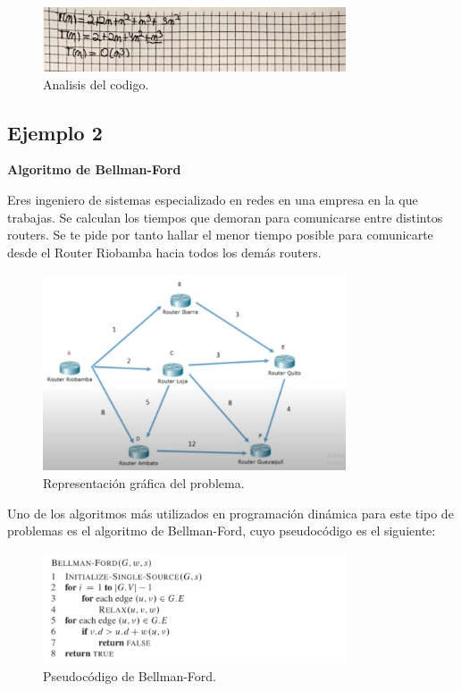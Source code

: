 \begin{figure}[H]
	\centering
	\includegraphics[width=0.8\textwidth]{complejidad_distancia_ejem1_3.png}
	\caption{Analisis del codigo.}
	\label{fig:complejidad1}
\end{figure}


\subsection{Ejemplo 2}
\textbf{Algoritmo de Bellman-Ford}

Eres ingeniero de sistemas especializado en redes en una empresa en la que trabajas. Se calculan los tiempos que demoran para comunicarse entre distintos routers. Se te pide por tanto hallar el menor tiempo posible para comunicarte desde el Router Riobamba hacia todos los demás routers. 

\begin{figure}[H]
	\centering
	\includegraphics[width=0.8\textwidth]{distancias_cortas_RepresentacionG1_ejem2.png}
	\caption{Representación gráfica del problema.}
	\label{fig:resultado}
\end{figure}


Uno de los algoritmos más utilizados en programación dinámica para este tipo de problemas es el algoritmo de Bellman-Ford, cuyo pseudocódigo es el siguiente:

\begin{figure}[H]
	\centering
	\includegraphics[width=0.8\textwidth]{distancias_cortas_Pseudo2.png}
	\caption{Pseudocódigo de Bellman-Ford.}
	\label{fig:resultado}
\end{figure}

